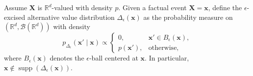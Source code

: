 \documentclass[anon,12pt]{clear2026} %
\begin{document}
\begin{example}
Assume $\mathbf{X}$ is $\mathbb{R}^d$-valued with density $p$.
Given a factual event $\mathbf{X}=\mathbf{x}$, define the
$\epsilon$-excised alternative value distribution $\Delta_\epsilon(\mathbf{x})$
as the probability measure on $(\mathbb{R}^d,\mathcal{B}(\mathbb{R}^d))$ with density
\[
p_{\Delta_\epsilon}(\mathbf{x}'\mid \mathbf{x})\propto
\begin{cases}
0, & \mathbf{x}'\in B_\epsilon(\mathbf{x}),\\[4pt]
p(\mathbf{x}'), & \text{otherwise},
\end{cases}
\]
where $B_\epsilon(\mathbf{x})$ denotes the $\epsilon$-ball centered at $\mathbf{x}$.
In particular, $\mathbf{x}\notin\operatorname{supp}(\Delta_\epsilon(\mathbf{x}))$.
\end{example}



\end{document}
